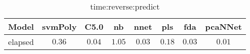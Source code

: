 \begin{table}[!ht]
	\centering
	\begin{tabular}{|c|c|c|c|c|c|c|c|}
		\hline
		Model & svmPoly & C5.0 & nb & nnet & pls & fda & pcaNNet \\ \hline
		elapsed & $0.36$ & $0.04$ & $1.05$ & $0.03$ & $0.18$ & $0.03$ & $0.01$ \\ \hline
	\end{tabular}
	\caption{time:reverse:predict}
	\label{tab:time:reverse:predict}
\end{table}
